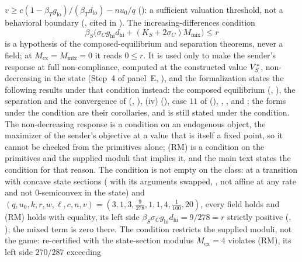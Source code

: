 $v\ge c(1-\beta_Tg_{\mathrm{lo}})/(\beta_Td_{\mathrm{lo}})-nu_0/q$
(): a sufficient valuation threshold, not a
behavioral boundary (, cited in
). The increasing-differences condition
\[
\beta_S\bigl(\sigma_Cg_{\mathrm{hi}}d_{\mathrm{hi}}+(K_S+2\sigma_C)M_{\mathrm{mix}}\bigr)\le r
\tag{RM}
\]
is a hypothesis of the composed-equilibrium and separation theorems, never a
field; at $M_{\mathrm{cx}}=M_{\mathrm{mix}}=0$ it reads $0\le r$. It is used
only to make the sender's response at full non-compliance, computed at the
constructed value $V_S^\ast$, non-decreasing in the state (Step~4 of panel~E,
), and the formalization states the
following results under that condition instead: the composed equilibrium
(, ), the
separation and the convergence of 
(,
), (iv)
(), case $11$ of
 (),
, ,
 and ; the forms under the condition are their corollaries,
and  is still stated under the condition.
The non-decreasing response is a condition on an endogenous object, the
maximizer of the sender's objective at a value that is itself a fixed point,
so it cannot be checked from the primitives alone; (RM) is a condition on the
primitives and the supplied moduli that implies it, and the main text states
the condition for that reason. The condition
is not empty on the class: at a transition with concave state sections
( with its arguments swapped, , not
affine at any rate and not $0$-semiconvex in the state) and
$(q,u_0,k,r,w,\ell,c,n,v)=(3,1,3,\tfrac{9}{278},1,1,4,\tfrac1{100},20)$,
every field holds and (RM) holds with equality, its left side
$\beta_S\sigma_Cg_{\mathrm{hi}}d_{\mathrm{hi}}=9/278=r$ strictly positive
(, ); the
mixed term is zero there. The condition restricts the supplied moduli,
not the game:  re-certified with the state-section
modulus $M_{\mathrm{cx}}=4$ violates (RM), its left side $270/287$ exceeding

